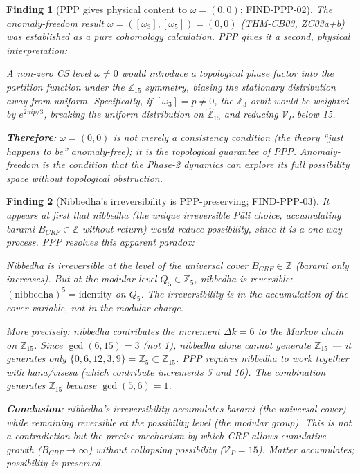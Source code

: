 \documentclass[12pt, a4paper]{article}
\newtheorem{finding}{Finding}[section]
\begin{document}
\begin{finding}[PPP gives physical content to $\omega = (0,0)$;
  FIND-PPP-02]
\label{find:omega}
The anomaly-freedom result $\omega = ([\omega_3], [\omega_5])
= (0,0)$ (THM-CB03, ZC03a+b) was established as a pure cohomology
calculation. PPP gives it a second, physical interpretation:

A non-zero CS level $\omega \neq 0$ would introduce a topological
phase factor into the partition function under the $\mathbb{Z}_{15}$
symmetry, biasing the stationary distribution away from uniform.
Specifically, if $[\omega_3] = p \neq 0$, the $\mathbb{Z}_3$
orbit would be weighted by $e^{2\pi i p / 3}$, breaking the
uniform distribution on $\hat{\mathbb{Z}}_{15}$ and reducing
$\mathcal{V}_P$ below 15.

\textbf{Therefore}: $\omega = (0,0)$ is not merely a consistency
condition (the theory ``just happens to be'' anomaly-free); it is
the \emph{topological guarantee of PPP}. Anomaly-freedom is the
condition that the Phase-2 dynamics can explore its full
possibility space without topological obstruction.
\end{finding}

\begin{finding}[Nibbedha's irreversibility is PPP-preserving;
  FIND-PPP-03]
\label{find:nibbedha}
It appears at first that nibbedha (the unique irreversible Pāli
choice, accumulating barami $B_{CRF} \in \mathbb{Z}$ without
return) would \emph{reduce} possibility, since it is a one-way
process. PPP resolves this apparent paradox:

Nibbedha is irreversible at the level of the universal cover
$B_{CRF} \in \mathbb{Z}$ (barami only increases). But at the
modular level $Q_5 \in \mathbb{Z}_5$, nibbedha is \emph{reversible}:
$(\text{nibbedha})^5 = \text{identity}$ on $Q_5$. The irreversibility
is in the accumulation of the cover variable, not in the modular
charge.

More precisely: nibbedha contributes the increment $\Delta k = 6$
to the Markov chain on $\mathbb{Z}_{15}$. Since $\gcd(6, 15) = 3$
(not 1), nibbedha alone cannot generate $\mathbb{Z}_{15}$ ---
it generates only $\{0, 6, 12, 3, 9\} = \mathbb{Z}_5 \subset
\mathbb{Z}_{15}$. PPP requires nibbedha to work together with
hāna/visesa (which contribute increments 5 and 10). The combination
generates $\mathbb{Z}_{15}$ because $\gcd(5, 6) = 1$.

\textbf{Conclusion}: nibbedha's irreversibility accumulates barami
(the universal cover) while remaining reversible at the possibility
level (the modular group). This is not a contradiction but the
precise mechanism by which CRF allows cumulative growth ($B_{CRF}
\to \infty$) without collapsing possibility ($\mathcal{V}_P = 15$).
Matter accumulates; possibility is preserved.
\end{finding}
\end{document}
